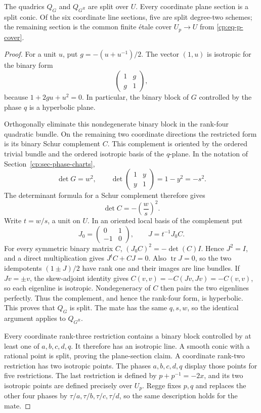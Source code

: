 \begin{lemma}
\label{cp:lem-split-strata}
The quadrics \(Q_G\) and \(Q_{G^R}\) are split over \(U\).  Every coordinate
plane section is a split conic.  Of the six coordinate line sections, five
are split degree-two schemes; the remaining section is the common finite
\'{e}tale cover \(U_p\to U\) from \eqref{cp:eq-p-cover}.
\end{lemma}

\begin{proof}
For a unit \(u\), put \(g=-(u+u^{-1})/2\).  The vector \((1,u)\) is
isotropic for the binary form
\[
 \begin{pmatrix}1&g\\g&1\end{pmatrix},
\]
because \(1+2gu+u^2=0\).  In particular, the binary block of \(G\)
controlled by the phase \(q\) is a hyperbolic plane.

Orthogonally eliminate this nondegenerate binary block in the rank-four
quadratic bundle.  On the remaining two coordinate directions the
restricted form is its binary Schur complement \(C\).  This complement is
oriented by the ordered trivial bundle and the ordered isotropic basis of
the \(q\)-plane.  In the notation of
Section~\ref{cp:sec-phase-charts},
\[
 \det G=w^2,
 \qquad
 \det\begin{pmatrix}1&y\\y&1\end{pmatrix}=1-y^2=-s^2.
\]
The determinant formula for a Schur complement therefore gives
\[
 \det C=-\left(\frac ws\right)^2.
\]
Write \(t=w/s\), a unit on \(U\).  In an oriented local basis of the
complement put
\[
 J_0=\begin{pmatrix}0&1\\-1&0\end{pmatrix},
 \qquad J=t^{-1}J_0C.
\]
For every symmetric binary matrix \(C\),
\((J_0C)^2=-\det(C)I\).  Hence \(J^2=I\), and a direct multiplication gives
\(J^tC+CJ=0\).  Also \(\operatorname{tr}J=0\), so the two idempotents
\((1\pm J)/2\) have rank one and their images are line bundles.  If
\(Jv=\pm v\), the skew-adjoint identity gives
\(C(v,v)=-C(Jv,Jv)=-C(v,v)\), so each eigenline is isotropic.
Nondegeneracy of \(C\) then pairs the two eigenlines perfectly.  Thus the
complement, and
hence the rank-four form, is hyperbolic.  This proves that \(Q_G\) is split.
The mate has the same \(q,s,w\), so the identical argument applies to
\(Q_{G^R}\).

Every coordinate rank-three restriction contains a binary block controlled
by at least one of \(a,b,c,d,q\).  It therefore has an isotropic line.  A
smooth conic with a rational point is split, proving the plane-section
claim.  A coordinate rank-two restriction has two isotropic points.  The
phases \(a,b,c,d,q\) display those points for five restrictions.  The last
restriction is defined by \(p+p^{-1}=-2x\), and its two isotropic points are
defined precisely over \(U_p\).  Regge fixes \(p,q\) and replaces the other
four phases by \(\tau/a,\tau/b,\tau/c,\tau/d\), so the same description
holds for the mate.
\end{proof}

